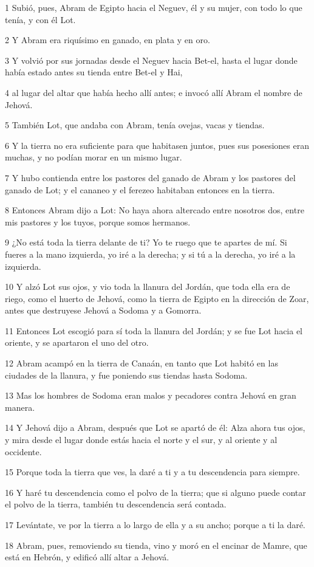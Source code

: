 \par 1 Subió, pues, Abram de Egipto hacia el Neguev, él y su mujer, con todo lo que tenía, y con él Lot.
\par 2 Y Abram era riquísimo en ganado, en plata y en oro.
\par 3 Y volvió por sus jornadas desde el Neguev hacia Bet-el, hasta el lugar donde había estado antes su tienda entre Bet-el y Hai,
\par 4 al lugar del altar que había hecho allí antes; e invocó allí Abram el nombre de Jehová.
\par 5 También Lot, que andaba con Abram, tenía ovejas, vacas y tiendas.
\par 6 Y la tierra no era suficiente para que habitasen juntos, pues sus posesiones eran muchas, y no podían morar en un mismo lugar.
\par 7 Y hubo contienda entre los pastores del ganado de Abram y los pastores del ganado de Lot; y el cananeo y el ferezeo habitaban entonces en la tierra.
\par 8 Entonces Abram dijo a Lot: No haya ahora altercado entre nosotros dos, entre mis pastores y los tuyos, porque somos hermanos.
\par 9 ¿No está toda la tierra delante de ti? Yo te ruego que te apartes de mí. Si fueres a la mano izquierda, yo iré a la derecha; y si tú a la derecha, yo iré a la izquierda.
\par 10 Y alzó Lot sus ojos, y vio toda la llanura del Jordán, que toda ella era de riego, como el huerto de Jehová, como la tierra de Egipto en la dirección de Zoar, antes que destruyese Jehová a Sodoma y a Gomorra.
\par 11 Entonces Lot escogió para sí toda la llanura del Jordán; y se fue Lot hacia el oriente, y se apartaron el uno del otro.
\par 12 Abram acampó en la tierra de Canaán, en tanto que Lot habitó en las ciudades de la llanura, y fue poniendo sus tiendas hasta Sodoma.
\par 13 Mas los hombres de Sodoma eran malos y pecadores contra Jehová en gran manera.
\par 14 Y Jehová dijo a Abram, después que Lot se apartó de él: Alza ahora tus ojos, y mira desde el lugar donde estás hacia el norte y el sur, y al oriente y al occidente.
\par 15 Porque toda la tierra que ves, la daré a ti y a tu descendencia para siempre.
\par 16 Y haré tu descendencia como el polvo de la tierra; que si alguno puede contar el polvo de la tierra, también tu descendencia será contada.
\par 17 Levántate, ve por la tierra a lo largo de ella y a su ancho; porque a ti la daré.
\par 18 Abram, pues, removiendo su tienda, vino y moró en el encinar de Mamre, que está en Hebrón, y edificó allí altar a Jehová.

